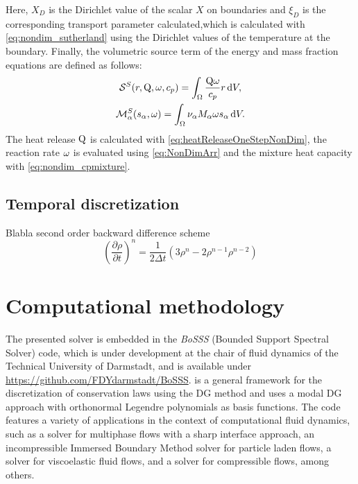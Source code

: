 Here, $X_D$ is the Dirichlet value of the scalar $X$ on boundaries and $\xi_D$ is the corresponding transport parameter calculated,which is calculated with \cref{eq:nondim_sutherland} using the Dirichlet values of the temperature at the boundary.
Finally, the volumetric source term of the energy and mass fraction equations are defined as follows:
\begin{gather}
	\mathcal{S}^S(r,\mathrm{Q}, \omega,c_p) =  \int_{\Omega}{ \frac{\mathrm{Q} \omega}{c_p} r} \,\mathrm{d} V, \\
	\mathcal{M}^S_\alpha(s_\alpha,\omega ) =  \int_{\Omega}{  \nu_\alpha M_\alpha \omega s_\alpha} \,\mathrm{d} V.
\end{gather}
The heat release $\mathrm{Q}$ is calculated with \cref{eq:heatReleaseOneStepNonDim}, the reaction rate $\omega$ is evaluated using \cref{eq:NonDimArr} and the mixture heat capacity with \cref{eq:nondim_cpmixture}.
\subsection{Temporal discretization}\label{ssec:TemporalDiscretization}
Blabla
second order backward difference scheme
\begin{equation}
\left(\frac{\partial \rho}{\partial t} \right)^n= \frac{1}{2\Delta t}\left(3\rho^n-2\rho^{n-1}\rho^{n-2}\right)
\end{equation}

\section{Computational methodology} \label{sec:CompMethodology}

The presented solver is embedded in the \textit{BoSSS} (Bounded Support Spectral Solver) code, which is under development at the chair of fluid dynamics of the Technical University of Darmstadt, and is available under \href{https://github.com/FDYdarmstadt/BoSSS}{https://github.com/FDYdarmstadt/BoSSS}. \BoSSS is a general framework for the discretization of conservation laws using the DG method and uses a modal DG approach with orthonormal Legendre polynomials as basis functions. The \BoSSS code features a variety of applications in the context of computational fluid dynamics, such as a solver for multiphase flows with a sharp interface approach, \cite{kummerExtendedDiscontinuousGalerkin2017} an incompressible Immersed Boundary Method solver for particle laden flows,\cite{krauseIncompressibleImmersedBoundary2017} a solver for viscoelastic fluid flows,\cite{kikkerFullyCoupledHighorder} and a solver for compressible flows, \cite{geisenhoferDiscontinuousGalerkinImmersed2019} among others.

